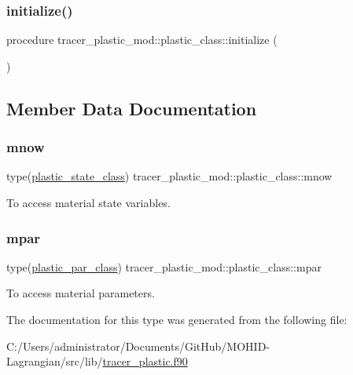 \subsubsection{\texorpdfstring{initialize()}{initialize()}}
{\footnotesize\ttfamily procedure tracer\+\_\+plastic\+\_\+mod\+::plastic\+\_\+class\+::initialize (\begin{DoxyParamCaption}{ }\end{DoxyParamCaption})\hspace{0.3cm}{\ttfamily [private]}}



\subsection{Member Data Documentation}
\mbox{\label{structtracer__plastic__mod_1_1plastic__class_ae30b971a131c8203026a7631dff3a51f}} 
\subsubsection{\texorpdfstring{mnow}{mnow}}
{\footnotesize\ttfamily type(\hyperlink{structtracer__plastic__mod_1_1plastic__state__class}{plastic\+\_\+state\+\_\+class}) tracer\+\_\+plastic\+\_\+mod\+::plastic\+\_\+class\+::mnow\hspace{0.3cm}{\ttfamily [private]}}



To access material state variables. 

\mbox{\label{structtracer__plastic__mod_1_1plastic__class_ae1a94a8bd2796aa13dfa820845f56563}} 
\subsubsection{\texorpdfstring{mpar}{mpar}}
{\footnotesize\ttfamily type(\hyperlink{structtracer__plastic__mod_1_1plastic__par__class}{plastic\+\_\+par\+\_\+class}) tracer\+\_\+plastic\+\_\+mod\+::plastic\+\_\+class\+::mpar\hspace{0.3cm}{\ttfamily [private]}}



To access material parameters. 



The documentation for this type was generated from the following file\+:\begin{DoxyCompactItemize}
\item 
C\+:/\+Users/administrator/\+Documents/\+Git\+Hub/\+M\+O\+H\+I\+D-\/\+Lagrangian/src/lib/\hyperlink{tracer__plastic_8f90}{tracer\+\_\+plastic.\+f90}\end{DoxyCompactItemize}
